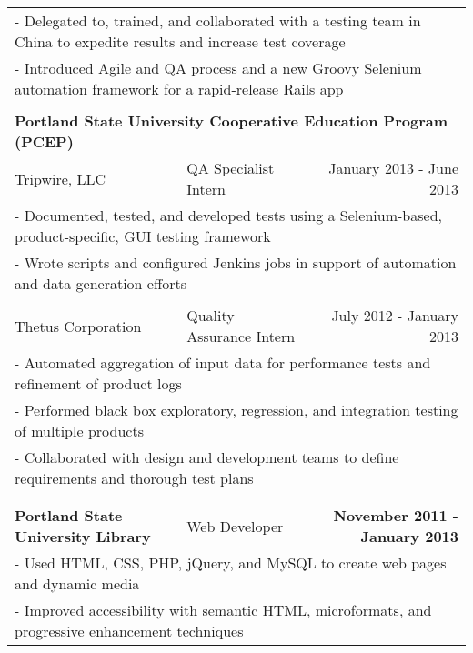 \documentclass[letterpaper]{article}
\begin{document}
\begin{center}
\begin{tabular}{p{}p{}r}
			\\
				\multicolumn{3}{p{\textwidth}}{\quad\quad - Delegated to, trained, and collaborated with a testing team in China to expedite results and increase test coverage}
			\\
				\multicolumn{3}{p{\textwidth}}{\quad\quad - Introduced Agile and QA process and a new Groovy Selenium automation framework for a rapid-release Rails app}  
			\\
			\\
				\multicolumn{3}{p{0.8\textwidth}}{\textbf{Portland State University Cooperative Education Program (PCEP)}}
			\\
				{\quad Tripwire, LLC}					&
				QA Specialist Intern							&
				{January 2013 - June 2013 \quad\quad}
			\\
				\multicolumn{3}{p{\textwidth}}{\quad\quad - Documented, tested, and developed tests using a Selenium-based, product-specific, GUI testing framework}
			\\
				\multicolumn{3}{p{\textwidth}}{\quad\quad - Wrote scripts and configured Jenkins jobs in support of automation and data generation efforts} 
			\\
			\\
				{\quad Thetus Corporation}					&
				Quality Assurance Intern						&
				{July 2012 - January 2013 \quad\quad}
			\\
				\multicolumn{3}{p{\textwidth}}{\quad\quad - Automated aggregation of input data for performance tests and refinement of product logs}
			\\
				\multicolumn{3}{p{\textwidth}}{\quad\quad - Performed black box exploratory, regression, and integration testing of multiple products} 
			\\
				\multicolumn{3}{p{\textwidth}}{\quad\quad - Collaborated with design and development teams to define requirements and thorough test plans}
			\\
			\\
			\\
				\textbf{Portland State University Library}						&
				Web Developer					&
				\textbf{November 2011 - January 2013 \quad}
			\\
				\multicolumn{3}{p{\textwidth}}{\quad\quad - Used HTML, CSS, PHP, jQuery, and MySQL to create web pages and dynamic media} 
			\\
				\multicolumn{3}{p{\textwidth}}{\quad\quad - Improved accessibility with semantic HTML, microformats, and progressive enhancement techniques} 
			\\

\end{tabular}
\end{center}
\end{document}
